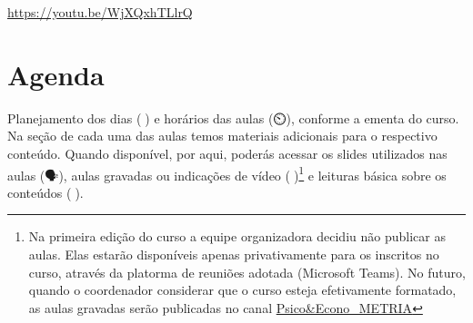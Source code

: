 \documentclass[
  a4paper,
]{book}
\begin{document}
\url{https://youtu.be/WjXQxhTLlrQ}


\chapter*{Agenda 📅}\label{sec-schedule}


Planejamento dos dias (📅) e horários das aulas (⏲️), conforme a ementa
do curso. Na seção de cada uma das aulas temos materiais adicionais para
o respectivo conteúdo. Quando disponível, por aqui, poderás acessar os
slides utilizados nas aulas (🗣️), aulas gravadas ou indicações de vídeo
(🎥)\footnote{Na primeira edição do curso a equipe organizadora decidiu
  não publicar as aulas. Elas estarão disponíveis apenas privativamente
  para os inscritos no curso, através da platorma de reuniões adotada
  (Microsoft Teams). No futuro, quando o coordenador considerar que o
  curso esteja efetivamente formatado, as aulas gravadas serão
  publicadas no canal
  \href{https://www.youtube.com/c/PsicoEconoMETRIA}{Psico\&Econo\_METRIA}}
e leituras básica sobre os conteúdos (📓).
\end{document}
